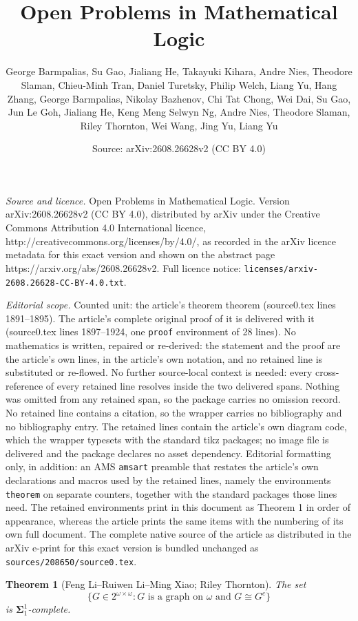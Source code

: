 \documentclass[10pt,a4paper]{amsart}
\title{Open Problems in Mathematical Logic}
\author{George Barmpalias, Su Gao, Jialiang He, Takayuki Kihara, Andre Nies, Theodore Slaman, Chieu-Minh Tran, Daniel Turetsky, Philip Welch, Liang Yu, Hang Zhang, George Barmpalias, Nikolay Bazhenov, Chi Tat Chong, Wei Dai, Su Gao, Jun Le Goh, Jialiang He, Keng Meng Selwyn Ng, Andre Nies, Theodore Slaman, Riley Thornton, Wei Wang, Jing Yu, Liang Yu}
\date{Source: arXiv:2608.26628v2 (CC BY 4.0)}
\newtheorem{theorem}{Theorem}
\begin{document}
\maketitle

\noindent\emph{Source and licence.} Open Problems in Mathematical Logic. Version arXiv:2608.26628v2 (CC BY 4.0), distributed by arXiv under the Creative Commons Attribution 4.0 International licence, http://creativecommons.org/licenses/by/4.0/, as recorded in the arXiv licence metadata for this exact version and shown on the abstract page https://arxiv.org/abs/2608.26628v2. Full licence notice: \texttt{licenses/arxiv-2608.26628-CC-BY-4.0.txt}.\par\smallskip

\noindent\textit{Editorial scope.} Counted unit: the article's theorem theorem (source0.tex lines 1891--1895). The article's complete original proof of it is delivered with it (source0.tex lines 1897--1924, one \texttt{proof} environment of 28 lines). No mathematics is written, repaired or re-derived: the statement and the proof are the article's own lines, in the article's own notation, and no retained line is substituted or re-flowed.  No further source-local context is needed: every cross-reference of every retained line resolves inside the two delivered spans.  Nothing was omitted from any retained span, so the package carries no omission record.  No retained line contains a citation, so the wrapper carries no bibliography and no bibliography entry.  The retained lines contain the article's own diagram code, which the wrapper typesets with the standard tikz packages; no image file is delivered and the package declares no asset dependency.  Editorial formatting only, in addition: an AMS \texttt{amsart} preamble that restates the article's own declarations and macros used by the retained lines, namely the environments \texttt{theorem} on separate counters, together with the standard packages those lines need.  The retained environments print in this document as Theorem 1 in order of appearance, whereas the article prints the same items with the numbering of its own full document.  The complete native source of the article as distributed in the arXiv e-print for this exact version is bundled unchanged as \texttt{sources/208650/source0.tex}.
\begin{theorem}[Feng Li--Ruiwen Li--Ming Xiao; Riley Thornton]
    The set
    $$\{G \in 2^{\omega \times \omega} : G \text{ is a graph on } \omega \text{ and } G \cong G^c\}$$
    is $\boldsymbol{\Sigma}_1^1$-complete.
\end{theorem}
\end{document}
